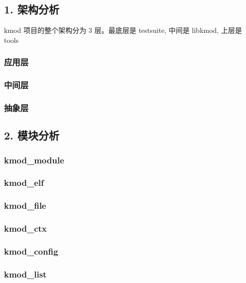 \documentclass[11pt,a4paper]{article}
\begin{document}
\subsection{1. 架构分析}

kmod 项目的整个架构分为 3 层。最底层是 testsuite, 中间是 libkmod, 上层是
tools

\subsubsection{应用层}

\subsubsection{中间层}

\subsubsection{抽象层}

\subsection{2. 模块分析}

\subsubsection{kmod\_module}

\subsubsection{kmod\_elf}

\subsubsection{kmod\_file}

\subsubsection{kmod\_ctx}

\subsubsection{kmod\_config}

\subsubsection{kmod\_list}
\end{document}

